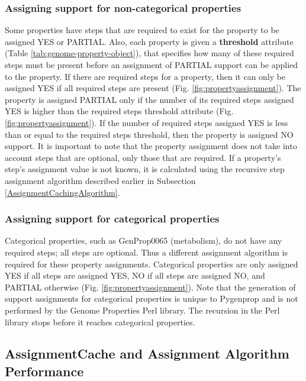 \subsubsection{Assigning support for non-categorical properties}

Some properties have steps that are required to exist for the property to be 
assigned YES or PARTIAL. Also, each property is given a \textbf{threshold} 
attribute (Table \ref{tab:genome-property-object}), that specifies how many of 
these required steps must be present before an assignment of PARTIAL support can 
be applied to the property. If there are required steps for a property, then it 
can only be assigned YES if all required steps are present (Fig. 
\ref{fig:propertyassignment}). The property is assigned PARTIAL only if the 
number of its required steps assigned YES is higher than the required steps 
threshold attribute (Fig. \ref{fig:propertyassignment}). If the number of 
required steps assigned YES is less than or equal to the required steps 
threshold, then the property is assigned NO support. It is important to note 
that the property assignment does not take into account steps that are optional, 
only those that are required. If a property's step's assignment value is not 
known, it is calculated using the recursive step assignment algorithm described 
earlier in Subsection \ref{AssignmentCachingAlgorithm}.

\subsubsection{Assigning support for categorical properties}

Categorical properties, such as GenProp0065 (metabolism), do not have any 
required steps; all steps are optional. Thus a different assignment algorithm is 
required for these property assignments. Categorical properties are only 
assigned YES if all steps are assigned YES, NO if all steps are assigned NO, and 
PARTIAL otherwise (Fig. \ref{fig:propertyassignment}). Note that the generation 
of support assignments for categorical properties is unique to Pygenprop and is 
not performed by the Genome Properties Perl library. The recursion in the Perl 
library stops before it reaches categorical properties.

\subsection{AssignmentCache and Assignment Algorithm Performance} 
\label{AssignmentCache-Performance}

